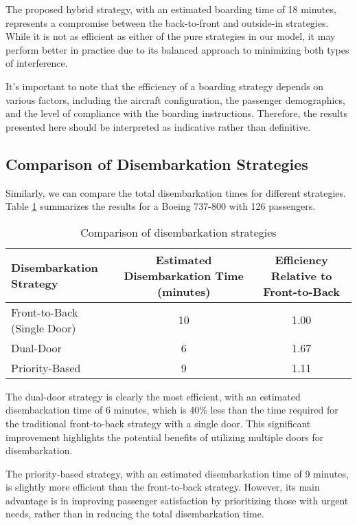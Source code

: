 The proposed hybrid strategy, with an estimated boarding time of 18 minutes, represents a compromise between the back-to-front and outside-in strategies. While it is not as efficient as either of the pure strategies in our model, it may perform better in practice due to its balanced approach to minimizing both types of interference.

It's important to note that the efficiency of a boarding strategy depends on various factors, including the aircraft configuration, the passenger demographics, and the level of compliance with the boarding instructions. Therefore, the results presented here should be interpreted as indicative rather than definitive.

\subsection{Comparison of Disembarkation Strategies}

Similarly, we can compare the total disembarkation times for different strategies. Table \ref{tab:disembarkation_comparison} summarizes the results for a Boeing 737-800 with 126 passengers.

\begin{table}[H]
\centering
\begin{tabular}{|l|c|c|}
\hline
\textbf{Disembarkation Strategy} & \textbf{Estimated Disembarkation Time (minutes)} & \textbf{Efficiency Relative to Front-to-Back} \\ \hline
Front-to-Back (Single Door) & 10 & 1.00 \\ \hline
Dual-Door & 6 & 1.67 \\ \hline
Priority-Based & 9 & 1.11 \\ \hline
\end{tabular}
\caption{Comparison of disembarkation strategies}
\label{tab:disembarkation_comparison}
\end{table}

The dual-door strategy is clearly the most efficient, with an estimated disembarkation time of 6 minutes, which is 40\% less than the time required for the traditional front-to-back strategy with a single door. This significant improvement highlights the potential benefits of utilizing multiple doors for disembarkation.

The priority-based strategy, with an estimated disembarkation time of 9 minutes, is slightly more efficient than the front-to-back strategy. However, its main advantage is in improving passenger satisfaction by prioritizing those with urgent needs, rather than in reducing the total disembarkation time.

